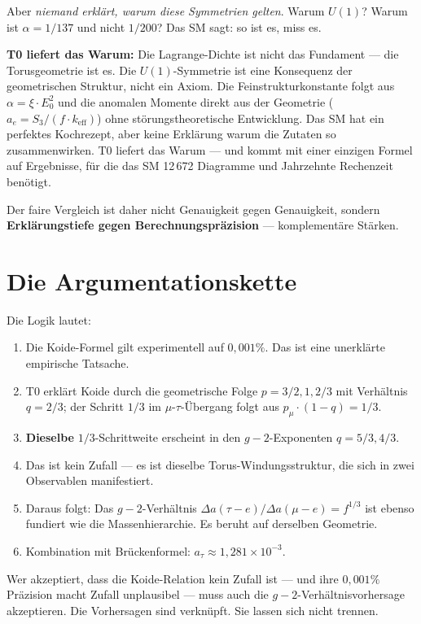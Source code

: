 Aber \textit{niemand erklärt, warum diese Symmetrien gelten}. Warum $U(1)$? Warum ist $\alpha = 1/137$ und nicht $1/200$? Das SM sagt: so ist es, miss es.

\textbf{T0 liefert das Warum:} Die Lagrange-Dichte ist nicht das Fundament — die Torusgeometrie ist es. Die $U(1)$-Symmetrie ist eine Konsequenz der geometrischen Struktur, nicht ein Axiom. Die Feinstrukturkonstante folgt aus $\alpha = \xi \cdot E_0^2$ und die anomalen Momente direkt aus der Geometrie ($a_e = S_3/(f \cdot k_\text{eff})$) ohne störungstheoretische Entwicklung. Das SM hat ein perfektes Kochrezept, aber keine Erklärung warum die Zutaten so zusammenwirken. T0 liefert das Warum — und kommt mit einer einzigen Formel auf Ergebnisse, für die das SM 12\,672 Diagramme und Jahrzehnte Rechenzeit benötigt.

Der faire Vergleich ist daher nicht Genauigkeit gegen Genauigkeit, sondern \textbf{Erklärungstiefe gegen Berechnungspräzision} — komplementäre Stärken.

\section{Die Argumentationskette}

Die Logik lautet:
\begin{enumerate}
	\item Die Koide-Formel gilt experimentell auf $0{,}001\%$. Das ist eine unerklärte empirische Tatsache.
	\item T0 erklärt Koide durch die geometrische Folge $p = 3/2, 1, 2/3$ mit Verhältnis $q = 2/3$; der Schritt $1/3$ im $\mu$-$\tau$-Übergang folgt aus $p_\mu \cdot (1-q) = 1/3$.
	\item \textbf{Dieselbe} $1/3$-Schrittweite erscheint in den $g-2$-Exponenten $q = 5/3, 4/3$.
	\item Das ist kein Zufall — es ist dieselbe Torus-Windungsstruktur, die sich in zwei Observablen manifestiert.
	\item Daraus folgt: Das $g-2$-Verhältnis $\Delta a(\tau{-}e)/\Delta a(\mu{-}e) = f^{1/3}$ ist ebenso fundiert wie die Massenhierarchie. Es beruht auf derselben Geometrie.
	\item Kombination mit Brückenformel: $a_\tau \approx 1{,}281 \times 10^{-3}$.
\end{enumerate}

Wer akzeptiert, dass die Koide-Relation kein Zufall ist — und ihre $0{,}001\%$ Präzision macht Zufall unplausibel — muss auch die $g-2$-Verhältnisvorhersage akzeptieren. Die Vorhersagen sind verknüpft. Sie lassen sich nicht trennen.

